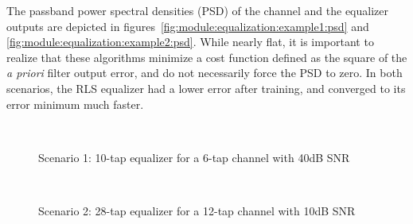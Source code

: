 The passband power spectral densities (PSD) of the channel and the equalizer outputs
are depicted in figures~\ref{fig:module:equalization:example1:psd} and
\ref{fig:module:equalization:example2:psd}.
While nearly flat, it is important to realize that these algorithms minimize
a cost function defined as the square of the {\it a priori} filter output error,
and do not necessarily force the PSD to zero.
In both scenarios, the RLS equalizer had a lower error after training, and converged to its
error minimum much faster.



\begin{figure}
\centering
\mbox{
   \quad
   \quad
}
\mbox{
   \quad
   \quad
}
\caption{Scenario 1: 10-tap equalizer for a 6-tap channel with 40dB SNR}
\label{fig:module:equalization:example1}
\end{figure}



\begin{figure}
\centering
\mbox{
   \quad
   \quad
}
\mbox{
   \quad
   \quad
}
\caption{Scenario 2: 28-tap equalizer for a 12-tap channel with 10dB SNR}
\label{fig:module:equalization:example2}
\end{figure}


